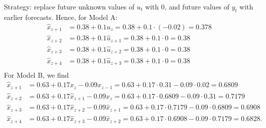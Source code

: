 \documentclass[11pt,a4paper]{article}
\begin{document}
\begin{itemize}
\begin{itemize}
Strategy: replace future unknown values of $u_t$ with 0, and future values of $y_t$ with earlier forecasts.
Hence, for Model A:
\begin{align*}
\hat{x}_{z+1} &= 0.38 + 0.1 u_z = 0.38 + 0.1 \cdot(-0.02) = 0.378\\
\hat{x}_{z+2} &= 0.38 + 0.1 \hat u_{z+1} = 0.38 + 0.1 \cdot 0 = 0.38\\
\hat{x}_{z+3} &= 0.38 + 0.1 \hat u_{z+2} = 0.38 + 0.1 \cdot 0 = 0.38\\
\hat{x}_{z+4} &= 0.38 + 0.1 \hat u_{z+3} = 0.38 + 0.1 \cdot 0 = 0.38\\
\end{align*}
For Model B, we find
\begin{align*}
\hat{x}_{z+1} &= 0.63 + 0.17 x_{z} -0.09 x_{z-1} =  0.63 + 0.17 \cdot 0.31 -0.09 \cdot 0.02 = 0.6809\\
\hat{x}_{z+2} &= 0.63 + 0.17 \hat x_{z+1} -0.09 x_{z} = 0.63 + 0.17 \cdot  0.6809 -0.09 \cdot 0.31 = 0.7179\\
\hat{x}_{z+3} &= 0.63 + 0.17 \hat x_{z+2} -0.09 \hat x_{z+1} = 0.63 + 0.17 \cdot 0.7179 -0.09 \cdot 0.6809 = 0.6908\\
\hat{x}_{z+4} &= 0.63 + 0.17 \hat x_{z+3} -0.09 \hat x_{z+2} = 0.63 + 0.17 \cdot 0.6908 -0.09 \cdot 0.7179 = 0.6828.
\end{align*}


\end{itemize}
\end{itemize}
\end{document}
